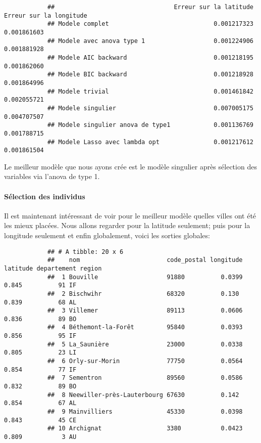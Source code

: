 \documentclass[french]{article}%
\begin{document}
			\begin{verbatim}
			##                                 Erreur sur la latitude Erreur sur la longitude
			## Modele complet                             0.001217323             0.001861603
			## Modele avec anova type 1                   0.001224906             0.001881928
			## Modele AIC backward                        0.001218195             0.001862060
			## Modele BIC backward                        0.001218928             0.001864996
			## Modele trivial                             0.001461842             0.002055721
			## Modele singulier                           0.007005175             0.004707507
			## Modele singulier anova de type1            0.001136769             0.001788715
			## Modele Lasso avec lambda opt               0.001217612             0.001861504
			\end{verbatim}
			
			Le meilleur modèle que nous ayons crée est le modèle singulier après sélection des variables via l'anova de type 1.
			
		\paragraph*{Sélection des individus}
		
			Il est maintenant intéressant de voir pour le meilleur modèle quelles villes ont été les mieux placées. Nous allons regarder pour la latitude seulement; puis pour la longitude seulement et enfin globalement, voici les sorties globales:
			
			\begin{verbatim}
			## # A tibble: 20 x 6
			##    nom                        code_postal longitude latitude departement region
			##  1 Bouville                   91880          0.0399    0.845          91 IF    
			##  2 Bischwihr                  68320          0.130     0.839          68 AL    
			##  3 Villemer                   89113          0.0606    0.836          89 BO    
			##  4 Béthemont-la-Forêt         95840          0.0393    0.856          95 IF    
			##  5 La_Saunière                23000          0.0338    0.805          23 LI    
			##  6 Orly-sur-Morin             77750          0.0564    0.854          77 IF    
			##  7 Sementron                  89560          0.0586    0.832          89 BO    
			##  8 Neewiller-près-Lauterbourg 67630          0.142     0.854          67 AL    
			##  9 Mainvilliers               45330          0.0398    0.843          45 CE    
			## 10 Archignat                  3380           0.0423    0.809           3 AU 
			\end{verbatim}
			
\end{document}
